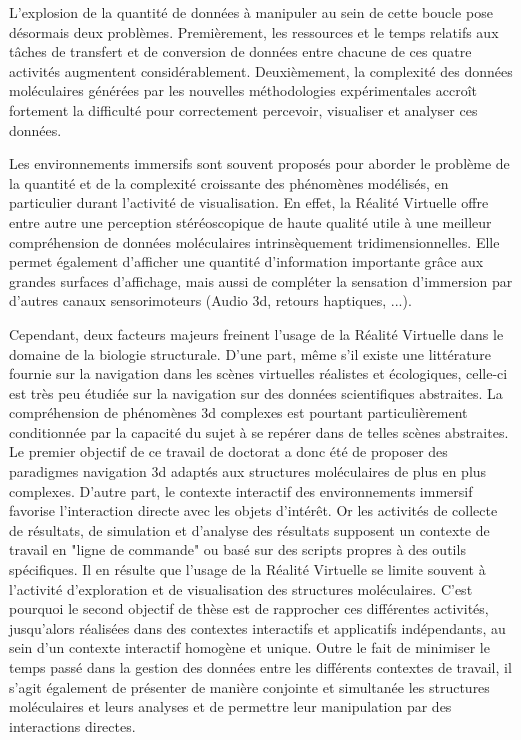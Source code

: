 L'explosion de la quantité de données à manipuler au sein de cette boucle pose désormais deux problèmes. Premièrement, les ressources et le temps relatifs aux tâches de transfert et de conversion de données entre chacune de ces quatre activités augmentent considérablement. Deuxièmement, la complexité des données moléculaires générées par les nouvelles méthodologies expérimentales accroît fortement la difficulté pour correctement percevoir, visualiser et analyser ces données.

Les environnements immersifs sont souvent proposés pour aborder le problème de la quantité et de la complexité croissante des phénomènes modélisés, en particulier durant l'activité de visualisation. En effet, la Réalité Virtuelle offre entre autre une perception stéréoscopique de haute qualité utile à une meilleur compréhension de données moléculaires intrinsèquement tridimensionnelles. Elle permet également d'afficher une quantité d'information importante grâce aux grandes surfaces d'affichage, mais aussi de compléter la sensation d'immersion par d'autres canaux sensorimoteurs (Audio 3d, retours haptiques, ...). 

Cependant, deux facteurs majeurs freinent l'usage de la Réalité Virtuelle dans le domaine de la biologie structurale. D'une part, même s'il existe une littérature fournie sur la navigation dans les scènes virtuelles réalistes et écologiques, celle-ci est très peu étudiée sur la navigation sur des données scientifiques abstraites. La compréhension de phénomènes 3d complexes est pourtant particulièrement conditionnée par la capacité du sujet à se repérer dans de telles scènes abstraites. Le premier objectif de ce travail de doctorat a donc été de proposer des paradigmes navigation 3d adaptés aux structures moléculaires de plus en plus complexes. D'autre part, le contexte interactif des environnements immersif favorise l'interaction directe avec les objets d'intérêt. Or les activités de collecte de résultats, de simulation et d'analyse des résultats supposent un contexte de travail en "ligne de commande" ou basé sur des scripts propres à des outils spécifiques. Il en résulte que l'usage de la Réalité Virtuelle se limite souvent à l'activité d'exploration et de visualisation des structures moléculaires. C'est pourquoi le second objectif de thèse est de rapprocher ces différentes activités, jusqu'alors réalisées dans des contextes interactifs et applicatifs indépendants, au sein d'un contexte interactif homogène et unique. Outre le fait de minimiser le temps passé dans la gestion des données entre les différents contextes de travail, il s'agit également de présenter de manière conjointe et simultanée les structures moléculaires et leurs analyses et de permettre leur manipulation par des interactions directes.

